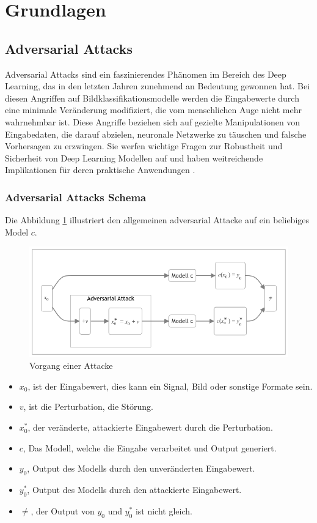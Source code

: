\section{Grundlagen} 
\subsection{Adversarial Attacks}

Adversarial Attacks sind ein faszinierendes Phänomen im Bereich des Deep Learning, das in den letzten Jahren zunehmend an Bedeutung gewonnen hat. Bei diesen Angriffen auf Bildklassifikationsmodelle werden die Eingabewerte durch eine minimale Veränderung modifiziert, die vom menschlichen Auge nicht mehr wahrnehmbar ist. Diese Angriffe beziehen sich auf gezielte Manipulationen von Eingabedaten, die darauf abzielen, neuronale Netzwerke zu täuschen und falsche Vorhersagen zu erzwingen. Sie werfen wichtige Fragen zur Robustheit und Sicherheit von Deep Learning Modellen auf und haben weitreichende Implikationen für deren praktische Anwendungen \cite{goodfellow_explaining_2015}. 

\subsubsection{Adversarial Attacks Schema} 

Die Abbildung \ref{fig:grundlagen} illustriert den allgemeinen adversarial Attacke auf ein beliebiges Model $c$. 

\begin{figure}[H]
    \centering
    \includegraphics[width=13.5cm]{01-images/02-grundlagen/adversarial-attack.png}
    \caption{Vorgang einer Attacke}
    \label{fig:grundlagen}
\end{figure}

\begin{itemize}
    \item $x_0$, ist der Eingabewert, dies kann ein Signal, Bild oder sonstige Formate sein.
    \item $v$, ist die Perturbation, die Störung.
    \item $x_0^{*}$, der veränderte, attackierte Eingabewert durch die Perturbation.
    \item $c$, Das Modell, welche die Eingabe verarbeitet und Output generiert.
    \item $y_0$, Output des Modells durch den unveränderten Eingabewert.
    \item $y_0^{*}$, Output des Modells durch den attackierte Eingabewert.
    \item $\neq$, der Output von $y_0$ und $y_0^{*}$ ist nicht gleich.
\end{itemize}


